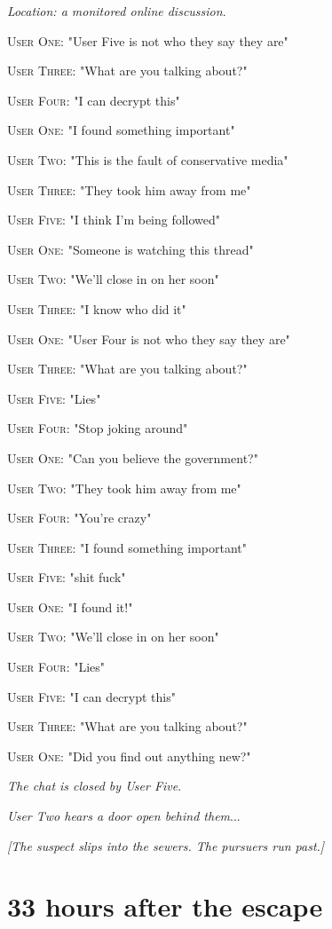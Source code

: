 \documentclass{report}
\begin{document}
\textit{Location: a monitored online discussion}. 

\textsc{User One}: "User Five is not who they say they are" 

\textsc{User Three}: "What are you talking about?" 

\textsc{User Four}: "I can decrypt this" 

\textsc{User One}: "I found something important" 

\textsc{User Two}: "This is the fault of conservative media" 

\textsc{User Three}: "They took him away from me" 

\textsc{User Five}: "I think I'm being followed" 

\textsc{User One}: "Someone is watching this thread" 

\textsc{User Two}: "We'll close in on her soon" 

\textsc{User Three}: "I know who did it" 

\textsc{User One}: "User Four is not who they say they are" 

\textsc{User Three}: "What are you talking about?" 

\textsc{User Five}: "Lies" 

\textsc{User Four}: "Stop joking around" 

\textsc{User One}: "Can you believe the government?" 

\textsc{User Two}: "They took him away from me" 

\textsc{User Four}: "You're crazy" 

\textsc{User Three}: "I found something important" 

\textsc{User Five}: "shit fuck" 

\textsc{User One}: "I found it!" 

\textsc{User Two}: "We'll close in on her soon" 

\textsc{User Four}: "Lies" 

\textsc{User Five}: "I can decrypt this" 

\textsc{User Three}: "What are you talking about?" 

\textsc{User One}: "Did you find out anything new?" 

\textit{The chat is closed by User Five}. 

\textit{User Two hears a door open behind them}...

\textit{[The suspect slips into the sewers. The pursuers run past.]}


\section*{33 \small{hours after the escape}}
\end{document}
